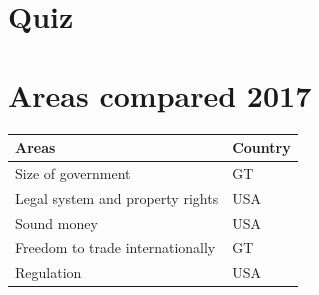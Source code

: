 \documentclass[openany]{book}
\begin{document}
\chapter{Quiz}





\chapter{Areas compared 2017}
\begin{center}
    \begin{tabular}{ |p{7cm}|p{7cm}| }
        \hline  
            Areas & Country \\ 
        \hline  
            Size of government & GT \\ 
        \hline  
            Legal system and property rights & USA \\ 
        \hline
            Sound money & USA \\ 
        \hline
            Freedom to trade internationally & GT \\ 
        \hline
            Regulation & USA \\ 
        \hline
    \end{tabular}
\end{center}

\end{document}
